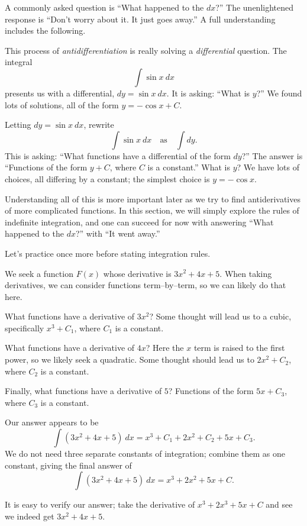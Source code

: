 A commonly asked question is ``What happened to the $dx$?'' The unenlightened response is ``Don't worry about it. It just goes away.'' A full understanding includes the following.

This process of \textit{antidifferentiation} is really solving a \textit{differential} question. The integral $$\int \sin x\ dx$$ presents us with a differential, $dy = \sin x\ dx$. It is asking: ``What is $y$?'' We found lots of solutions, all of the form $y = -\cos x+C$.

Letting $dy = \sin x\ dx$,  rewrite 
$$\int \sin x \ dx \quad \text{as}\quad \int  dy.$$
This is asking: ``What functions have a differential of the form $dy$?'' The answer is ``Functions of the form $y+C$, where $C$ is a constant.'' What is $y$? We have lots of choices, all differing by a constant; the simplest choice is $y = -\cos x$.

Understanding all of this is more important later as we try to find antiderivatives of more complicated functions. In this section, we will simply explore the rules of indefinite integration, and one can succeed for now with answering ``What happened to the $dx$?'' with ``It went away.''

Let's practice once more before stating integration rules.\\

{We seek a function $F(x)$ whose derivative is $3x^2+4x+5$. When taking derivatives, we can consider functions term--by--term, so we can likely do that here.

What functions have a derivative of $3x^2$? Some thought will lead us to a cubic, specifically $x^3+C_1$, where $C_1$ is a constant. 

What functions have a derivative of $4x$? Here the $x$ term is raised to the first power, so we likely seek a quadratic. Some thought should lead us to $2x^2+C_2$, where $C_2$ is a constant.

Finally, what functions have a derivative of $5$? Functions of the form $5x+C_3$, where $C_3$ is a constant.

Our answer appears to be 
$$\int (3x^2+4x+5)\ dx = x^3+C_1+2x^2+C_2+5x+C_3.$$ We do not need three separate constants of integration; combine them as one constant, giving the final answer of 
$$\int (3x^2+4x+5)\ dx = x^3+2x^2+5x+C.$$

It is easy to verify our answer; take the derivative of $x^3+2x^3+5x+C$ and see we indeed get $3x^2+4x+5$.
}\\

